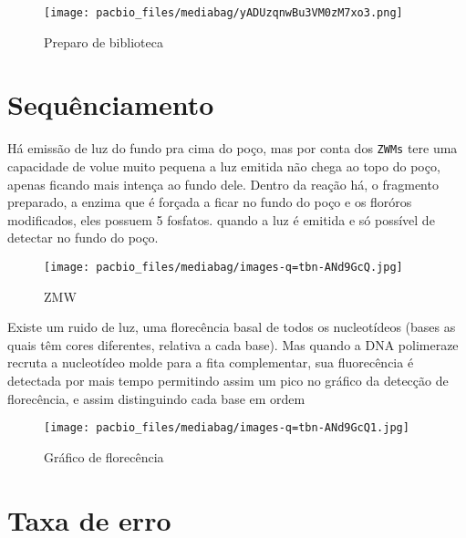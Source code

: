\documentclass[
  letterpaper,
  DIV=11,
  numbers=noendperiod]{scrartcl}
\begin{document}
\begin{figure}[H]

{\centering \texttt{[image: pacbio\_files/mediabag/yADUzqnwBu3VM0zM7xo3.png]}

}

\caption{Preparo de biblioteca}

\end{figure}%

\section{Sequênciamento}\label{sequuxeanciamento}

Há emissão de luz do fundo pra cima do poço, mas por conta dos
\texttt{ZWMs} tere uma capacidade de volue muito pequena a luz emitida
não chega ao topo do poço, apenas ficando mais intença ao fundo dele.
Dentro da reação há, o fragmento preparado, a enzima que é forçada a
ficar no fundo do poço e os floróros modificados, eles possuem 5
fosfatos. quando a luz é emitida e só possível de detectar no fundo do
poço.

\begin{figure}[H]

{\centering \texttt{[image: pacbio\_files/mediabag/images-q=tbn-ANd9GcQ.jpg]}

}

\caption{ZMW}

\end{figure}%

Existe um ruido de luz, uma florecência basal de todos os nucleotídeos
(bases as quais têm cores diferentes, relativa a cada base). Mas quando
a DNA polimeraze recruta a nucleotídeo molde para a fita complementar,
sua fluorecência é detectada por mais tempo permitindo assim um pico no
gráfico da detecção de florecência, e assim distinguindo cada base em
ordem

\begin{figure}[H]

{\centering \texttt{[image: pacbio\_files/mediabag/images-q=tbn-ANd9GcQ1.jpg]}

}

\caption{Gráfico de florecência}

\end{figure}%

\section{Taxa de erro}\label{taxa-de-erro}
\end{document}
